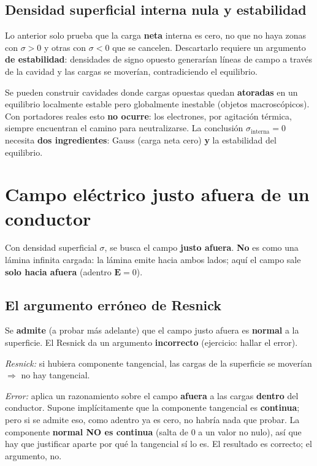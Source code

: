 \documentclass[12pt,a4paper]{article}
\begin{document}
\subsection{Densidad superficial interna nula y estabilidad}

Lo anterior solo prueba que la carga \textbf{neta} interna es cero, no
que no haya zonas con $\sigma>0$ y otras con $\sigma<0$ que se cancelen.
Descartarlo requiere un argumento \textbf{de estabilidad}: densidades de
signo opuesto generarían líneas de campo a través de la cavidad y las
cargas se moverían, contradiciendo el equilibrio.

\begin{notebox}
  Se pueden construir cavidades donde cargas opuestas quedan
  \textbf{atoradas} en un equilibrio localmente estable pero globalmente
  inestable (objetos macroscópicos). Con portadores reales esto
  \textbf{no ocurre}: los electrones, por agitación térmica, siempre
  encuentran el camino para neutralizarse. La conclusión
  $\sigma_{\text{interna}}=0$ necesita \textbf{dos ingredientes}: Gauss
  (carga neta cero) \textbf{y} la estabilidad del equilibrio.
\end{notebox}

\section{Campo eléctrico justo afuera de un conductor}

Con densidad superficial $\sigma$, se busca el campo \textbf{justo
afuera}. \textbf{No} es como una lámina infinita cargada: la lámina
emite hacia ambos lados; aquí el campo sale \textbf{solo hacia afuera}
(adentro $\mathbf{E}=0$).

\subsection{El argumento erróneo de Resnick}

Se \textbf{admite} (a probar más adelante) que el campo justo afuera es
\textbf{normal} a la superficie. El Resnick da un argumento
\textbf{incorrecto} (ejercicio: hallar el error).

\begin{warnbox}
  \emph{Resnick:} si hubiera componente tangencial, las cargas de la
  superficie se moverían $\Rightarrow$ no hay tangencial.

  \emph{Error:} aplica un razonamiento sobre el campo \textbf{afuera} a
  las cargas \textbf{dentro} del conductor. Supone implícitamente que la
  componente tangencial es \textbf{continua}; pero si se admite eso,
  como adentro ya es cero, no habría nada que probar. La componente
  \textbf{normal NO es continua} (salta de $0$ a un valor no nulo), así
  que hay que justificar aparte por qué la tangencial sí lo es. El
  resultado es correcto; el argumento, no.
\end{warnbox}
\end{document}

